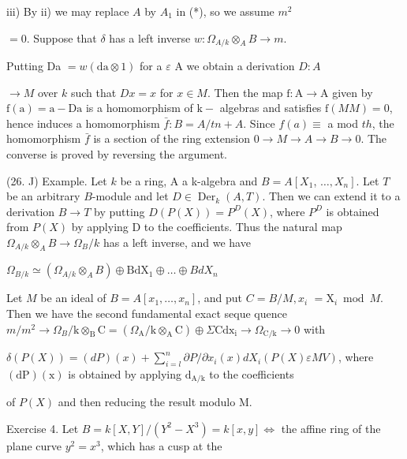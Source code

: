 iii) By ii) we may replace $A$ by $A_{1}$ in (*), so we assume $m^{2}$

$=0$. Suppose that $\delta$ has a left inverse $w: \Omega_{A / k} \otimes_{A} B \rightarrow m$.

Putting Da $=w(\mathrm{da} \otimes 1)$ for a $\varepsilon$ A we obtain a derivation $D: A$

$\rightarrow M$ over $k$ such that $D x=x$ for $x \in M$. Then the map $\mathrm{f}: \mathrm{A} \rightarrow \mathrm{A}$ given by $\mathrm{f}(\mathrm{a})=\mathrm{a}-\mathrm{Da}$ is a homomorphism of $\mathrm{k}-$ algebras and satisfies $\mathrm{f}(M M)=0$, hence induces a homomorphism $\bar{f}: B=A / t n+A$. Since $f(a) \equiv$ a mod $t h$, the homomorphism $\bar{f}$ is a section of the ring extension $0 \rightarrow M \rightarrow A \rightarrow B \rightarrow 0$. The converse is proved by reversing the argument.

(26. J) Example. Let $k$ be a ring, A a k-algebra and $B=A\left[X_{1}\right.$, $\left.\ldots, X_{n}\right] .$ Let $T$ be an arbitrary $B$-module and let $D \in \operatorname{Der}_{k}(A, T)$. Then we can extend it to a derivation $B \rightarrow T$ by putting $D(P(X))=P^{D}(X)$, where $P^{D}$ is obtained from $P(X)$ by applying D to the coefficients. Thus the natural map $\Omega_{A / k} \otimes_{A} B \rightarrow \Omega_{B} / k$ has a left inverse, and we have

$\Omega_{B / k} \simeq\left(\Omega_{A / k} \otimes_{A} B\right) \oplus \mathrm{BdX}_{1} \oplus \ldots \oplus B d X_{n}$

Let $M$ be an ideal of $B=A\left[x_{1}, \ldots, x_{n}\right]$, and put $C=B / M, x_{i}$ $=\mathrm{X}_{i} \bmod M$. Then we have the second fundamental exact seque quence $m / m^{2} \rightarrow \Omega_{B} / \mathrm{k} \otimes_{\mathrm{B}} \mathrm{C}=\left(\Omega_{\mathrm{A}} / \mathrm{k} \otimes_{\mathrm{A}} \mathrm{C}\right) \oplus \Sigma \mathrm{Cdx}{ }_{\mathrm{i}} \rightarrow \Omega_{\mathrm{C} / \mathrm{k}} \rightarrow 0$ with

$\delta(P(X))=(d P)(x)+\sum_{i=l}^{n} \partial P / \partial x_{i}(x) d X_{i}(P(X) \varepsilon M V)$, where $(\mathrm{dP})(\mathrm{x})$ is obtained by applying $\mathrm{d}_{\mathrm{A} / \mathrm{k}}$ to the coefficients

of $P(X)$ and then reducing the result modulo M.

Exercise 4. Let $B=k[X, Y] /\left(Y^{2}-X^{3}\right)=k[x, y] \Leftrightarrow$ the affine ring of the plane curve $y^{2}=x^{3}$, which has a cusp at the

